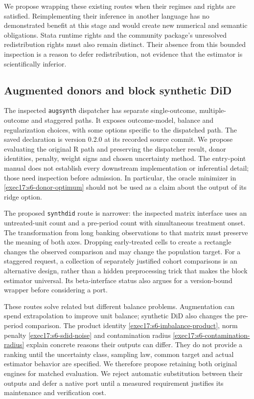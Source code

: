 We propose wrapping these existing routes when their regimes and
rights are satisfied. Reimplementing their inference in another
language has no demonstrated benefit at this stage and would create
new numerical and semantic obligations. Stata runtime rights and
the community package's unresolved redistribution rights must also
remain distinct. Their absence from this bounded inspection is a
reason to defer redistribution, not evidence that the estimator is
scientifically inferior.

\subsection{Augmented donors and block synthetic DiD}

The inspected \texttt{augsynth} dispatcher has separate single-outcome,
multiple-outcome and staggered paths. It exposes outcome-model,
balance and regularization choices, with some options specific to
the dispatched path. The saved declaration is version 0.2.0 at its
recorded source commit. We propose evaluating the original R path
and preserving the dispatcher result, donor identities, penalty,
weight signs and chosen uncertainty method. The entry-point manual
does not establish every downstream implementation or inferential
detail; those need inspection before admission. In particular, the
oracle minimizer in \eqref{exec17:s6-donor-optimum} should not be
used as a claim about the output of its ridge option.
\citep{v12_sw_augsynth,exec17_s6_paths}

The proposed \texttt{synthdid} route is narrower: the inspected
matrix interface uses an untreated-unit count and a pre-period
count with simultaneous treatment onset. The transformation from
long banking observations to that matrix must preserve the meaning
of both axes. Dropping early-treated cells to create a rectangle
changes the observed comparison and may change the population
target. For a staggered request, a collection of separately justified
cohort comparisons is an alternative design, rather than a hidden
preprocessing trick that makes the block estimator universal.
Its beta-interface status also argues for a version-bound wrapper
before considering a port.\citep{sw_synthdid}

These routes solve related but different balance problems. Augmentation
can spend extrapolation to improve unit balance; synthetic DiD also
changes the pre-period comparison. The product identity
\eqref{exec17:s6-imbalance-product}, norm penalty
\eqref{exec17:s6-sdid-noise} and contamination radius
\eqref{exec17:s6-contamination-radius} explain concrete reasons their
outputs can differ. They do not provide a ranking until the uncertainty
class, sampling law, common target and actual estimator behavior are
specified. We therefore propose retaining both original engines for
matched evaluation. We reject automatic substitution between their
outputs and defer a native port until a measured requirement justifies
its maintenance and verification cost.

